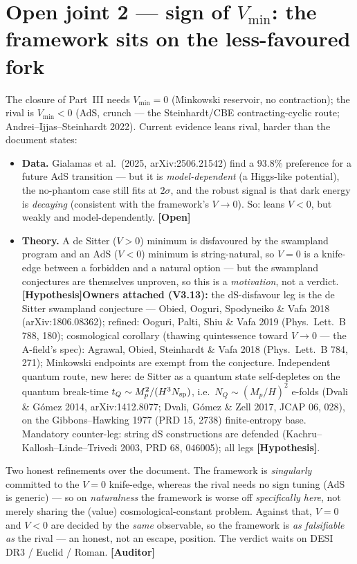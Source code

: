 \documentclass[11pt]{article}
\newcommand{\Hyp}{\textbf{\textcolor{blue!55!black}{[Hypothesis]}}}
\newcommand{\Open}{\textbf{\textcolor{gray!10!black}{[Open]}}}
\newcommand{\Auditor}{\textbf{\textcolor{teal!55!black}{[Auditor]}}}
\begin{document}
\section{Open joint 2 --- sign of $V_{\min}$: the framework sits on the less-favoured fork}
The closure of Part~III needs $V_{\min}=0$ (Minkowski reservoir, no contraction); the rival is $V_{\min}<0$ (AdS, crunch --- the Steinhardt/CBE contracting-cyclic route; Andrei--Ijjas--Steinhardt 2022). Current evidence leans rival, harder than the document states:
\begin{itemize}[leftmargin=1.6em]
\item \textbf{Data.} Gialamas et al.\ (2025, arXiv:2506.21542) find a $93.8\%$ preference for a future AdS transition --- but it is \emph{model-dependent} (a Higgs-like potential), the no-phantom case still fits at $2\sigma$, and the robust signal is that dark energy is \emph{decaying} (consistent with the framework's $V\!\to\!0$). So: leans $V<0$, but weakly and model-dependently. \Open
\item \textbf{Theory.} A de Sitter ($V>0$) minimum is disfavoured by the swampland program and an AdS ($V<0$) minimum is string-natural, so $V=0$ is a knife-edge between a forbidden and a natural option --- but the swampland conjectures are themselves unproven, so this is a \emph{motivation}, not a verdict. \Hyp \textbf{Owners attached (V3.13):} the dS-disfavour leg is the de Sitter swampland conjecture --- Obied, Ooguri, Spodyneiko \& Vafa 2018 (arXiv:1806.08362); refined: Ooguri, Palti, Shiu \& Vafa 2019 (Phys.\ Lett.\ B 788, 180); cosmological corollary (thawing quintessence toward $V\to0$ --- the A-field's spec): Agrawal, Obied, Steinhardt \& Vafa 2018 (Phys.\ Lett.\ B 784, 271); Minkowski endpoints are exempt from the conjecture. Independent quantum route, new here: de Sitter as a quantum state self-depletes on the quantum break-time $t_Q\sim M_p^2/(H^3 N_{\rm sp})$, i.e.\ $N_Q\sim(M_p/H)^2$ e-folds (Dvali \& G\'omez 2014, arXiv:1412.8077; Dvali, G\'omez \& Zell 2017, JCAP 06, 028), on the Gibbons--Hawking 1977 (PRD 15, 2738) finite-entropy base. Mandatory counter-leg: string dS constructions are defended (Kachru--Kallosh--Linde--Trivedi 2003, PRD 68, 046005); all legs \Hyp.
\end{itemize}
Two honest refinements over the document. The framework is \emph{singularly} committed to the $V=0$ knife-edge, whereas the rival needs no sign tuning (AdS is generic) --- so on \emph{naturalness} the framework is worse off \emph{specifically here}, not merely sharing the (value) cosmological-constant problem. Against that, $V=0$ and $V<0$ are decided by the \emph{same} observable, so the framework is \emph{as falsifiable as} the rival --- an honest, not an escape, position. The verdict waits on DESI DR3 / Euclid / Roman. \Auditor
\end{document}
